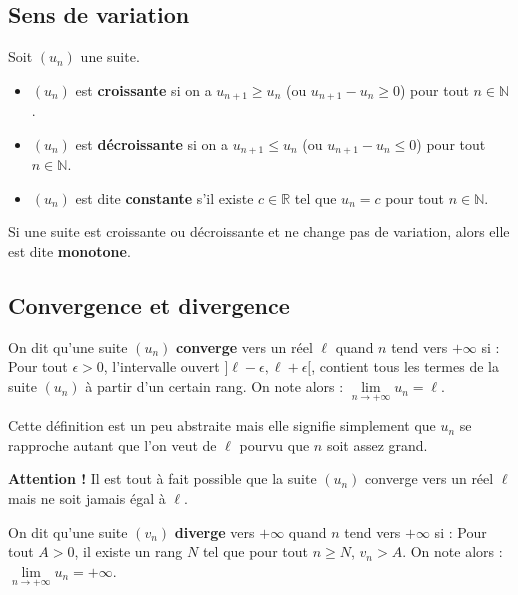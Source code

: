 	\subsection{Sens de variation}

	\begin{formula}[Définition]
		Soit $(u_n)$ une suite.
		\begin{itemize}
			\item $(u_n)$ est \textbf{croissante} si on a $u_{n+1} \geq u_n$ (ou $u_{n+1} - u_n \geq 0$) pour tout $n \in \mathbb{N}$.
			\item $(u_n)$ est \textbf{décroissante} si on a $u_{n+1} \leq u_n$ (ou $u_{n+1} - u_n \leq 0$) pour tout $n \in \mathbb{N}$.
			\item $(u_n)$ est dite \textbf{constante} s'il existe $c \in \mathbb{R}$ tel que $u_n = c$ pour tout $n \in \mathbb{N}$.
		\end{itemize}
	\end{formula}

	Si une suite est croissante ou décroissante et ne change pas de variation, alors elle est dite \textbf{monotone}.

	\subsection{Convergence et divergence}

	\begin{formula}[Convergence]
		On dit qu'une suite $(u_n)$ \textbf{converge} vers un réel $\ell$ quand $n$ tend vers $+\infty$ si :
		\newpar
		Pour tout $\epsilon > 0$, l'intervalle ouvert $]\ell-\epsilon, \ell+\epsilon[$, contient tous les termes de la suite $(u_n)$ à partir d'un certain rang. On note alors : $\lim\limits_{n \rightarrow +\infty} u_n = \ell$.
	\end{formula}

	\begin{tip}
		Cette définition est un peu abstraite mais elle signifie simplement que $u_n$ se rapproche autant que l'on veut de $\ell$ pourvu que $n$ soit assez grand.
	\end{tip}

	\textbf{Attention !} Il est tout à fait possible que la suite $(u_n)$ converge vers un réel $\ell$ mais ne soit jamais égal à $\ell$.

	\begin{formula}
		On dit qu'une suite $(v_n)$ \textbf{diverge} vers $+\infty$ quand $n$ tend vers $+\infty$ si :
		\newpar
		Pour tout $A > 0$, il existe un rang $N$ tel que pour tout $n \geq N$, $v_n > A$. On note alors : $\lim\limits_{n \rightarrow +\infty} u_n = +\infty$.
	\end{formula}

